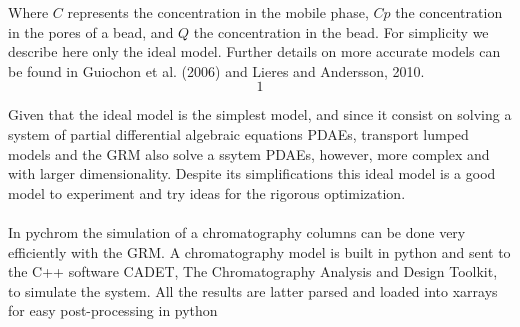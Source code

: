 \documentclass[paper=a4, fontsize=11pt]{scrartcl}
\begin{document}
Where $C$ represents the concentration in the mobile phase, $Cp$ the concentration in the pores of a bead, and $Q$ the concentration in the bead. For simplicity we describe here only the ideal model. Further details on more accurate models can be found in Guiochon et al. (2006) and Lieres and Andersson, 2010.
\begin{equation}
1
\end{equation}

Given that the ideal model is the simplest model, and since it consist on solving a system of partial differential algebraic equations PDAEs, transport lumped models and the GRM also solve a ssytem PDAEs, however, more complex and with larger dimensionality. Despite its simplifications this ideal model is a good model to experiment and try ideas for the rigorous optimization.  
\\
\\
In pychrom the simulation of a chromatography columns can be done very efficiently with the GRM. A chromatography model is built in python and sent to the C++ software CADET, The Chromatography Analysis and Design Toolkit, to simulate the system. All the results are latter parsed and loaded into xarrays for easy post-processing in python
 

\end{document}
